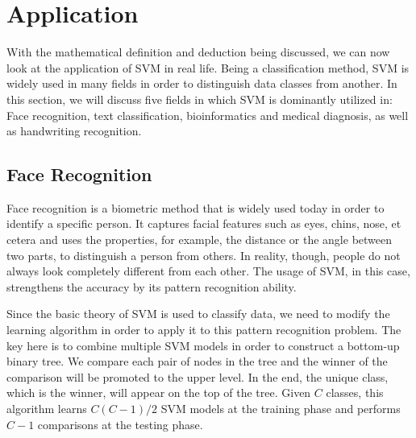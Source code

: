 \section{Application}
With the mathematical definition and deduction being discussed, we can now
look at the application of SVM in real life. Being a classification method,
SVM is widely used in many fields in order to distinguish data classes from
another. In this section, we will discuss five fields in which SVM is dominantly
utilized in: Face recognition, text classification,
bioinformatics and medical diagnosis, as well as handwriting recognition.

\subsection*{Face Recognition}
Face recognition is a biometric method that is widely used today in order
to identify a specific
person. It captures facial features such as eyes, chins, nose, et cetera and
uses the properties, for example, the distance or the angle between two parts, 
to distinguish a person from others. In reality, though, people do not always
look completely different from each other. The usage of SVM, 
in this case, strengthens the accuracy by its pattern recognition ability.

Since the basic theory of SVM is used to classify data, we
need to modify the learning algorithm in order to apply it to this pattern
recognition problem. The key here is to combine multiple SVM models in order
to construct a bottom-up binary tree. We compare each pair of nodes in the
tree and the winner of the comparison will be promoted to the upper level.
In the end, the unique class, which is the winner, will appear on the top of 
the tree. Given $C$ classes, this algorithm learns $C(C-1)/2$ SVM models at
the training phase and performs $C-1$ comparisons at the testing phase.

